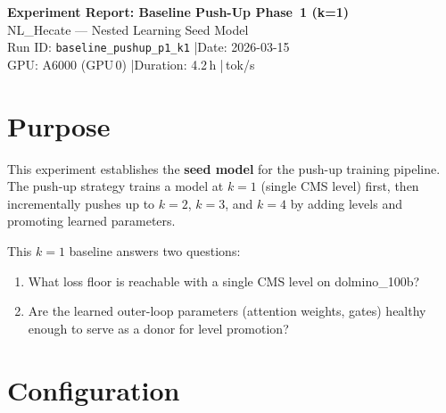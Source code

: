 \documentclass[11pt,a4paper]{article}
\begin{document}
\begin{center}
    {\LARGE\bfseries Experiment Report: Baseline Push-Up Phase~1 (k=1)}\\[0.6em]
    {\large\color{nlgray} NL\_Hecate --- Nested Learning Seed Model}\\[0.4em]
    {\normalsize Run ID: \texttt{baseline\_pushup\_p1\_k1} \quad|\quad Date: 2026-03-15}\\[0.3em]
    {\normalsize GPU: A6000 (GPU\,0) \quad|\quad Duration: 4.2\,h \quad|\,tok/s}
\end{center}
\vspace{1em}

\section{Purpose}

This experiment establishes the \textbf{seed model} for the push-up training pipeline. The push-up
strategy trains a model at $k{=}1$ (single CMS level) first, then incrementally pushes up to $k{=}2$,
$k{=}3$, and $k{=}4$ by adding levels and promoting learned parameters.

This $k{=}1$ baseline answers two questions:
\begin{enumerate}[topsep=4pt, itemsep=2pt]
    \item What loss floor is reachable with a single CMS level on dolmino\_100b?
    \item Are the learned outer-loop parameters (attention weights, gates) healthy enough to serve
          as a donor for level promotion?
\end{enumerate}

\section{Configuration}
\end{document}
